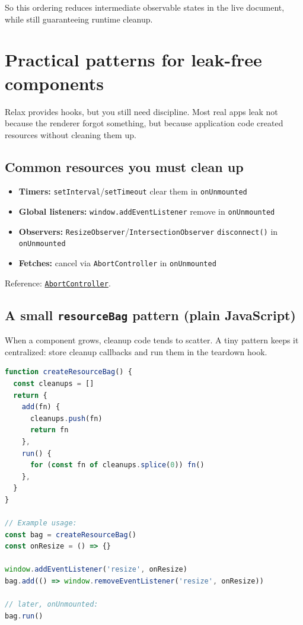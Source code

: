 So this ordering reduces intermediate observable states in the live document, while still guaranteeing runtime cleanup.

\section{Practical patterns for leak-free components}

Relax provides hooks, but you still need discipline.
Most real apps leak not because the renderer forgot something, but because application code created resources without cleaning them up.

\subsection{Common resources you must clean up}

\begin{itemize}
  \item \textbf{Timers:} \texttt{setInterval}/\texttt{setTimeout} \textrightarrow clear them in \texttt{onUnmounted}
  \item \textbf{Global listeners:} \texttt{window.addEventListener} \textrightarrow remove in \texttt{onUnmounted}
  \item \textbf{Observers:} \texttt{ResizeObserver}/\texttt{IntersectionObserver} \textrightarrow \texttt{disconnect()} in \texttt{onUnmounted}
  \item \textbf{Fetches:} cancel via \texttt{AbortController} in \texttt{onUnmounted}
\end{itemize}

Reference: \href{https://developer.mozilla.org/en-US/docs/Web/API/AbortController}{\texttt{AbortController}}.

\subsection{A small \texttt{resourceBag} pattern (plain JavaScript)}

When a component grows, cleanup code tends to scatter.
A tiny pattern keeps it centralized: store cleanup callbacks and run them in the teardown hook.

\begin{lstlisting}[style=relax,language=JavaScript]
function createResourceBag() {
  const cleanups = []
  return {
    add(fn) {
      cleanups.push(fn)
      return fn
    },
    run() {
      for (const fn of cleanups.splice(0)) fn()
    },
  }
}

// Example usage:
const bag = createResourceBag()
const onResize = () => {}

window.addEventListener('resize', onResize)
bag.add(() => window.removeEventListener('resize', onResize))

// later, onUnmounted:
bag.run()
\end{lstlisting}

